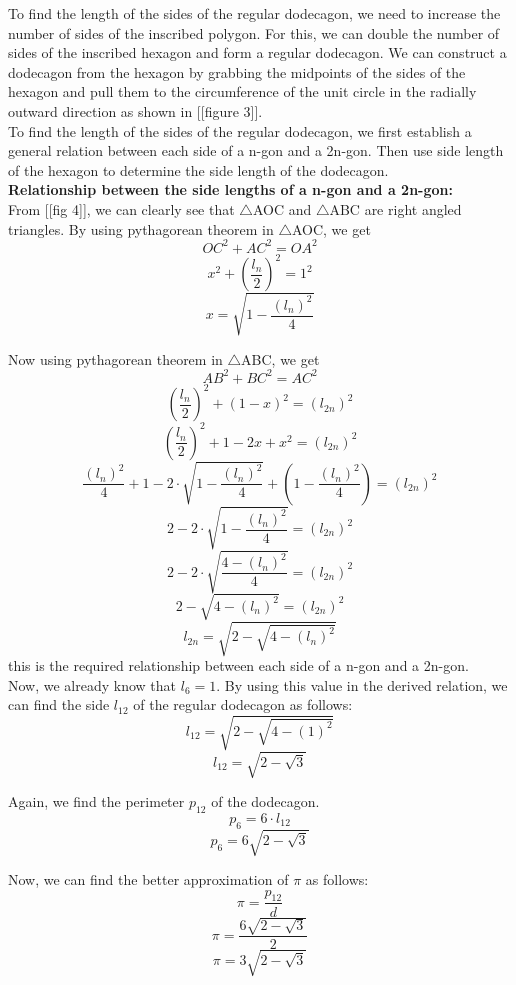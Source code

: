 \documentclass[12pt]{article}
\begin{document}
To find the length of the sides of the regular dodecagon,  we need to increase the
number of sides of the inscribed polygon. For this, we can double the number of
sides of the inscribed hexagon and form a regular dodecagon. We can construct
a dodecagon from the hexagon by grabbing the midpoints of the sides of the
hexagon and pull them to the circumference of the unit circle in the radially
outward direction as shown in [[figure 3]]. \\

To find the length of the sides of the regular dodecagon, we first establish a
general relation between each side of a n-gon and a 2n-gon. Then use side length
of the hexagon to determine the side length of the dodecagon.\\

\textbf{Relationship between the side lengths of a n-gon and a 2n-gon:}\\


From [[fig 4]], we can clearly see that $\bigtriangleup$AOC and $\bigtriangleup$ABC are right angled triangles. By using pythagorean theorem in $\bigtriangleup$AOC, we get
$$OC^{2}+AC^{2}=OA^{2}$$
$$x^{2}+(\frac{l_{n}}{2})^{2} = 1^{2}$$
$$x = \sqrt{1-\frac{(l_{n})^{2}}{4}}$$

Now using pythagorean theorem in $\bigtriangleup$ABC, we get\\
$$AB^{2}+BC^{2}=AC^{2}$$
$$(\frac{l_{n}}{2})^{2}+(1-x)^{2} = (l_{2n})^{2}$$
$$(\frac{l_{n}}{2})^{2} + 1-2x+x^{2} = (l_{2n})^{2}$$
$$\frac{(l_{n})^{2}}{4}+1-2\cdot\sqrt{1-\frac{(l_{n})^{2}}{4}}+(1-\frac{(l_{n})^{2}}{4})=(l_{2n})^{2}$$
$$2-2\cdot\sqrt{1-\frac{(l_{n})^{2}}{4}}=(l_{2n})^{2}$$
$$2-2\cdot\sqrt{\frac{4-(l_{n})^{2}}{4}}=(l_{2n})^{2}$$
$$2-\sqrt{4-(l_{n})^{2}}=(l_{2n})^{2}$$
$$l_{2n}=\sqrt{2-\sqrt{4-(l_{n})^{2}}}$$
this is the required relationship between each side of a n-gon and a 2n-gon.\\

Now, we already know that $l_{6}=1$. By using this value in the derived relation, we can find the side $l_{12}$ of the regular dodecagon as follows:\\
$$l_{12} = \sqrt{2-\sqrt{4-(1)^{2}}}$$
$$l_{12} = \sqrt{2-\sqrt{3}}$$

Again, we find the perimeter $p_{12}$ of the dodecagon.
$$p_{6}=6\cdot l_{12}$$
$$p_{6}=6\sqrt{2-\sqrt{3}}$$

Now, we can find the better approximation of $\pi$ as follows:
$$\pi = \frac{p_{12}}{d}$$
$$\pi = \frac{6\sqrt{2-\sqrt{3}}}{2}$$
$$\pi = 3\sqrt{2-\sqrt{3}}$$
\end{document}
